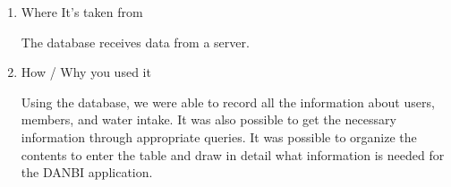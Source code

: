 \documentclass[conference]{IEEEtran}
\begin{document}
\begin{itemize}
\begin{enumerate}
\begin{itemize}
            [Fig. \ref{fig:db_record}] Record tables are individually connected to each person, animal, and plant table, but the contents of the column are the same. There is a 'date' column of the DATETIME type, which automatically stores the current time except for manually inputting, and stores the time when manually input is performed. In addition, active\_intake is used to record the amount of water consumed.
            \item stamp
            \setlength{\parindent}{2ex}
            \par \begin{figure}[h!]
            \texttt{[image: image/db\_stamp.jpg]}
            \centering
            \caption{}
            \label{fig:db_stamp}
            \end{figure}
            
            [Fig. \ref{fig:db_stamp}] When certain conditions are met, the corresponding members and dates are stored in the stamp. After that, this value is called in the stamp calendar.
        \end{itemize}
        
        \item Where It's taken from
        
        The database receives data from a server.
        \item How / Why you used it
        
        Using the database, we were able to record all the information about users, members, and water intake. It was also possible to get the necessary information through appropriate queries. It was possible to organize the contents to enter the table and draw in detail what information is needed for the DANBI application.
    \end{enumerate}
\end{itemize}
\end{document}
